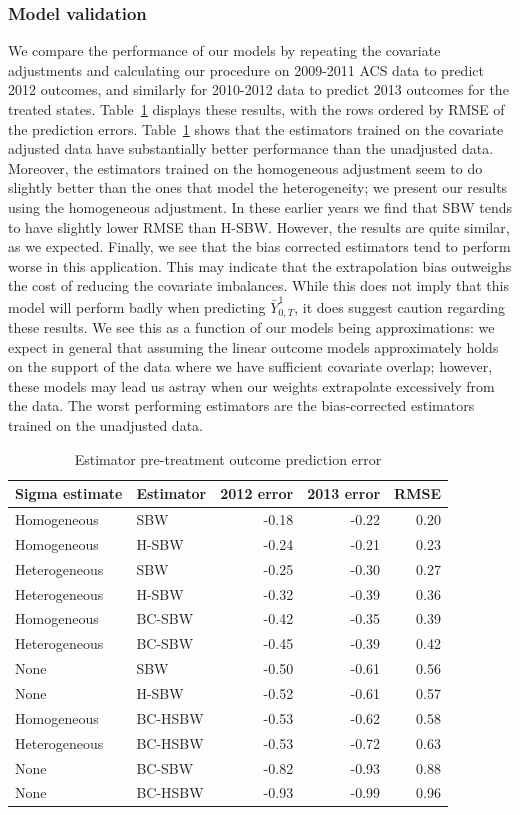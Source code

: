 \documentclass[aoas]{imsart}
\theoremstyle{plain}
\theoremstyle{remark}
\begin{document}
\subsubsection{Model validation}

We compare the performance of our models by repeating the covariate adjustments and calculating our procedure on 2009-2011 ACS data to predict 2012 outcomes, and similarly for 2010-2012 data to predict 2013 outcomes for the treated states. Table~\ref{tab:pretxpred} displays these results, with the rows ordered by RMSE of the prediction errors. Table~\ref{tab:pretxpred} shows that the estimators trained on the covariate adjusted data have substantially better performance than the unadjusted data. Moreover, the estimators trained on the homogeneous adjustment seem to do slightly better than the ones that model the heterogeneity; we present our results using the homogeneous adjustment. In these earlier years we find that SBW tends to have slightly lower RMSE than H-SBW. However, the results are quite similar, as we expected. Finally, we see that the bias corrected estimators tend to perform worse in this application. This may indicate that the extrapolation bias outweighs the cost of reducing the covariate imbalances. While this does not imply that this model will perform badly when predicting $\bar{Y}^1_{0, T}$, it does suggest caution regarding these results. We see this as a function of our models being approximations: we expect in general that assuming the linear outcome models approximately holds on the support of the data where we have sufficient covariate overlap; however, these models may lead us astray when our weights extrapolate excessively from the data. The worst performing estimators are the bias-corrected estimators trained on the unadjusted data.

\begin{table}[ht]
\caption{Estimator pre-treatment outcome prediction error}
\label{tab:pretxpred}
\begin{tabular}{llrrr}
  \hline
Sigma estimate & Estimator & 2012 error & 2013 error & RMSE \\ 
  \hline
Homogeneous & SBW & -0.18 & -0.22 & 0.20 \\ 
  Homogeneous & H-SBW & -0.24 & -0.21 & 0.23 \\ 
  Heterogeneous & SBW & -0.25 & -0.30 & 0.27 \\ 
  Heterogeneous & H-SBW & -0.32 & -0.39 & 0.36 \\ 
  Homogeneous & BC-SBW & -0.42 & -0.35 & 0.39 \\ 
  Heterogeneous & BC-SBW & -0.45 & -0.39 & 0.42 \\ 
  None & SBW & -0.50 & -0.61 & 0.56 \\ 
  None & H-SBW & -0.52 & -0.61 & 0.57 \\ 
  Homogeneous & BC-HSBW & -0.53 & -0.62 & 0.58 \\ 
  Heterogeneous & BC-HSBW & -0.53 & -0.72 & 0.63 \\ 
  None & BC-SBW & -0.82 & -0.93 & 0.88 \\ 
  None & BC-HSBW & -0.93 & -0.99 & 0.96 \\ 
   \hline
\end{tabular}
\end{table}
\end{document}
